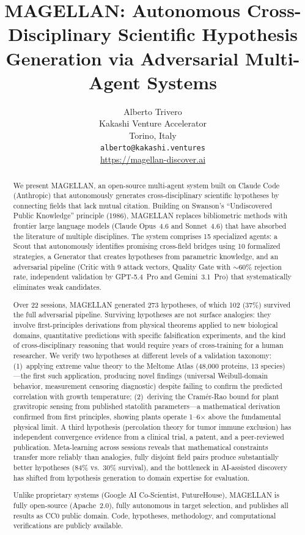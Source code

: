 \documentclass[11pt]{article}
\title{MAGELLAN: Autonomous Cross-Disciplinary Scientific Hypothesis Generation via Adversarial Multi-Agent Systems}
\author{
Alberto Trivero\\
Kakashi Venture Accelerator\\
Torino, Italy\\
\texttt{alberto@kakashi.ventures}\\
\url{https://magellan-discover.ai}
}
\date{}
\begin{document}
\maketitle

\begin{abstract}
We present MAGELLAN, an open-source multi-agent system built on Claude Code (Anthropic) that autonomously generates cross-disciplinary scientific hypotheses by connecting fields that lack mutual citation. Building on Swanson's ``Undiscovered Public Knowledge'' principle (1986), MAGELLAN replaces bibliometric methods with frontier large language models (Claude Opus~4.6 and Sonnet~4.6) that have absorbed the literature of multiple disciplines. The system comprises 15 specialized agents: a Scout that autonomously identifies promising cross-field bridges using 10 formalized strategies, a Generator that creates hypotheses from parametric knowledge, and an adversarial pipeline (Critic with 9 attack vectors, Quality Gate with ${\sim}60\%$ rejection rate, independent validation by GPT-5.4~Pro and Gemini~3.1~Pro) that systematically eliminates weak candidates.

Over 22 sessions, MAGELLAN generated 273 hypotheses, of which 102 (37\%) survived the full adversarial pipeline. Surviving hypotheses are not surface analogies: they involve first-principles derivations from physical theorems applied to new biological domains, quantitative predictions with specific falsification experiments, and the kind of cross-disciplinary reasoning that would require years of cross-training for a human researcher. We verify two hypotheses at different levels of a validation taxonomy: (1)~applying extreme value theory to the Meltome Atlas (48{,}000 proteins, 13 species)---the first such application, producing novel findings (universal Weibull-domain behavior, measurement censoring diagnostic) despite failing to confirm the predicted correlation with growth temperature; (2)~deriving the Cram\'{e}r-Rao bound for plant gravitropic sensing from published statolith parameters---a mathematical derivation confirmed from first principles, showing plants operate 1--6$\times$ above the fundamental physical limit. A third hypothesis (percolation theory for tumor immune exclusion) has independent convergence evidence from a clinical trial, a patent, and a peer-reviewed publication. Meta-learning across sessions reveals that mathematical constraints transfer more reliably than analogies, fully disjoint field pairs produce substantially better hypotheses (84\% vs.\ 30\% survival), and the bottleneck in AI-assisted discovery has shifted from hypothesis generation to domain expertise for evaluation.

Unlike proprietary systems (Google AI Co-Scientist, FutureHouse), MAGELLAN is fully open-source (Apache~2.0), fully autonomous in target selection, and publishes all results as CC0 public domain. Code, hypotheses, methodology, and computational verifications are publicly available.
\end{abstract}
\end{document}
